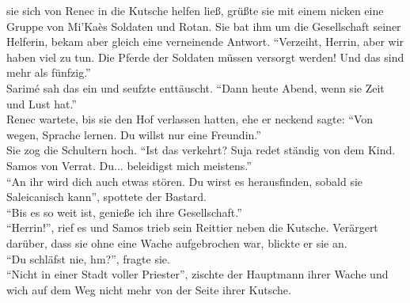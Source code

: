 sie sich von Renec in die Kutsche helfen ließ, grüßte sie mit einem nicken eine Gruppe von Mi'Kaès 
Soldaten und Rotan. Sie bat ihm um die Gesellschaft seiner Helferin, bekam aber gleich eine 
verneinende Antwort. ``Verzeiht, Herrin, aber wir haben viel zu tun. Die Pferde der Soldaten müssen 
versorgt werden! Und das sind mehr als fünfzig.''\\
Sarimé sah das ein und seufzte enttäuscht. ``Dann heute Abend, wenn sie Zeit und Lust hat.''\\
Renec wartete, bis sie den Hof verlassen hatten, ehe er neckend sagte: ``Von wegen, Sprache lernen. 
Du willst nur eine Freundin.''\\
Sie zog die Schultern hoch. ``Ist das verkehrt? Suja redet ständig von dem Kind. Samos von Verrat. 
Du... beleidigst mich meistens.''\\
``An ihr wird dich auch etwas stören. Du wirst es herausfinden, sobald sie Saleicanisch kann'', 
spottete der Bastard.\\
``Bis es so weit ist, genieße ich ihre Gesellschaft.''\\
``Herrin!'', rief es und Samos trieb sein Reittier neben die Kutsche. Verärgert darüber, dass sie 
ohne eine Wache aufgebrochen war, blickte er sie an.\\
``Du schläfst nie, hm?'', fragte sie.\\
``Nicht in einer Stadt voller Priester'', zischte der Hauptmann ihrer Wache und wich auf dem Weg 
nicht mehr von der Seite ihrer Kutsche.\\

